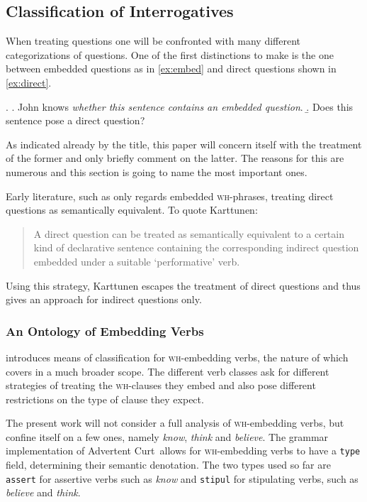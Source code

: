 \documentclass[12pt,a4paper]{article}
\newcommand{\term}{\textsf} %
\newcommand{\code}{\texttt} %
\newcommand{\pn}{\textsf} %
\newcommand{\example}{\textit} %
\newcommand{\wh}{\textsc{wh}} %
\newcommand{\acurt}{\pn{Advertent Curt}\mbox{ }}
\theoremstyle{remark} \newtheorem*{termin}{Definition} %
\begin{document}
\subsection{Classification of Interrogatives}

When treating questions one will be confronted with many different
categorizations of questions. One of the first distinctions to make is the one
between \term{embedded questions} as in \ref{ex:embed} and \term{direct
questions} shown in \ref{ex:direct}.

\ex. \a. John knows \emph{whether this sentence contains an embedded
question}.\label{ex:embed}
\b. Does this sentence pose a direct question?\label{ex:direct}

As indicated already by the title, this paper will concern itself with the
treatment of the former and only briefly comment on the latter. The reasons for
this are numerous  %
and this section is going to name the most important ones.

Early literature, such as \cite{karttunen:1977} only regards embedded
\wh-phrases, treating direct questions as semantically equivalent. To quote
Karttunen:

\begin{quote}A direct question can be treated as semantically equivalent to a
certain kind of declarative sentence containing the corresponding indirect
question embedded under  a suitable `performative' verb.\end{quote}

Using this strategy, Karttunen escapes the treatment of direct  questions and
thus gives an approach for indirect questions only.

\subsubsection{An Ontology of Embedding Verbs}

\cite{karttunen:1977} introduces means of classification for \wh-embedding
verbs, the nature of which \cite{lahiri:diss} covers in a much broader scope.
The different verb classes ask for different strategies of treating the
\wh-clauses they embed and also pose different restrictions on the type of
clause they expect.

The present work will not consider a full analysis of \wh-embedding verbs, but
confine itself on a few ones, namely \example{know}, \example{think} and
\example{believe}. The grammar implementation of \acurt allows for \wh-embedding
verbs to have a \code{type} field, determining their semantic denotation. The two
types used so far are \code{assert} for assertive verbs such as \example{know}
and \code{stipul} for stipulating verbs, such as \example{believe} and
\example{think}.
\end{document}
